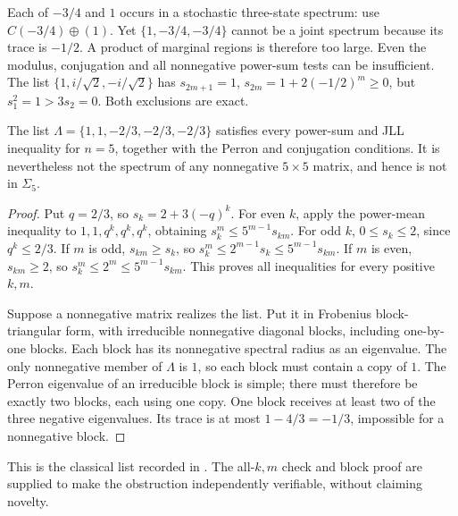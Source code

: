 \begin{example}
Each of \(-3/4\) and \(1\) occurs in a stochastic three-state
spectrum: use \(C(-3/4)\oplus(1)\).
Yet \(\{1,-3/4,-3/4\}\) cannot be a joint spectrum because its
trace is \(-1/2\). A product of marginal regions is therefore too large.
Even the modulus, conjugation and all nonnegative power-sum tests
can be insufficient. The list \(\{1,i/\sqrt2,-i/\sqrt2\}\) has
\(s_{2m+1}=1\), \(s_{2m}=1+2(-1/2)^m\geq0\), but
\(s_1^2=1>3s_2=0\). Both exclusions are exact.
\end{example}

\begin{proposition}
\label{prop:five-obstruction}
The list \(\Lambda=\{1,1,-2/3,-2/3,-2/3\}\) satisfies every
power-sum and JLL inequality for \(n=5\), together with the Perron and
conjugation conditions. It is nevertheless not the spectrum of any
nonnegative \(5\times5\) matrix, and hence is not in \(\Sigma_5\).
\end{proposition}
\begin{proof}
Put \(q=2/3\), so \(s_k=2+3(-q)^k\).
For even \(k\), apply the power-mean inequality to
\(1,1,q^k,q^k,q^k\), obtaining
\(s_k^m\leq5^{m-1}s_{km}\).
For odd \(k\), \(0\leq s_k\leq2\), since \(q^k\leq2/3\).
If \(m\) is odd, \(s_{km}\geq s_k\), so
\(s_k^m\leq2^{m-1}s_k\leq5^{m-1}s_{km}\).
If \(m\) is even, \(s_{km}\geq2\), so
\(s_k^m\leq2^m\leq5^{m-1}s_{km}\).
This proves all inequalities for every positive \(k,m\).

Suppose a nonnegative matrix realizes the list. Put it in Frobenius
block-triangular form, with irreducible nonnegative diagonal blocks,
including one-by-one blocks. Each block has its nonnegative spectral
radius as an eigenvalue. The only nonnegative member of \(\Lambda\)
is \(1\), so each block must contain a copy of \(1\).
The Perron eigenvalue of an irreducible block is simple; there must
therefore be exactly two blocks, each using one copy.
One block receives at least two of the three negative eigenvalues.
Its trace is at most \(1-4/3=-1/3\), impossible for a nonnegative block.
\end{proof}
This is the classical list recorded in
\citet[Section~2]{croninlaffey2018diagonalizable}.
The all-\(k,m\) check and block proof are supplied to make the
obstruction independently verifiable, without claiming novelty.

